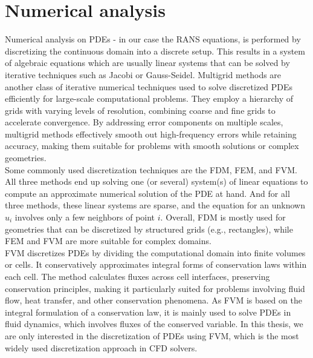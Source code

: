 \section{Numerical analysis}
Numerical analysis on \gls{PDE}s - in our case the RANS equations, is performed by discretizing the continuous domain into a discrete setup. This results in a system of algebraic equations which are usually linear systems that can be solved by iterative techniques such as Jacobi or Gauss-Seidel. Multigrid methods are another class of iterative numerical techniques used to solve discretized PDEs efficiently for large-scale computational problems. They employ a hierarchy of grids with varying levels of resolution, combining coarse and fine grids to accelerate convergence. By addressing error components on multiple scales, multigrid methods effectively smooth out high-frequency errors while retaining accuracy, making them suitable for problems with smooth solutions or complex geometries. \\
Some commonly used discretization techniques are the \gls{FDM}, \gls{FEM}, and \gls{FVM}. All three methods end up solving one (or several) system(s) of linear equations to compute an approximate numerical solution of the PDE at hand. And for all three methods, these linear systems are sparse, and the equation for an unknown $u_i$ involves only a few neighbors of point $i$. Overall, FDM is mostly used for geometries that can be discretized by structured grids (e.g., rectangles), while FEM and FVM are more suitable for complex domains. \\
FVM discretizes PDEs by dividing the computational domain into finite volumes or cells. It conservatively approximates integral forms of conservation laws within each cell. The method calculates fluxes across cell interfaces, preserving conservation principles, making it particularly suited for problems involving fluid flow, heat transfer, and other conservation phenomena. As FVM is based on the integral formulation of a conservation law, it is mainly used to solve PDEs in fluid dynamics, which involves fluxes of the conserved variable. In this thesis, we are only interested in the discretization of PDEs using FVM, which is the most widely used discretization approach in CFD solvers. 
